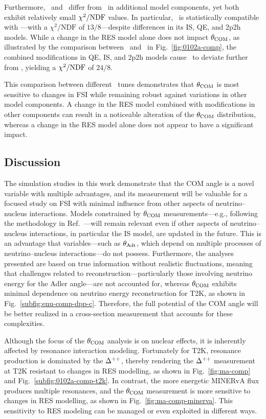      Furthermore, \geoa\ and \getwoa\ differ from \gZero\ in additional model components, yet both exhibit relatively small $\chi^2/{\textrm{NDF}}$ values.
     In particular, \getwoa\ is statistically compatible with \gZero—with a $\chi^2/\textrm{NDF}$ of $13/8$—despite differences in its IS, QE, and 2p2h models.
     While a change in the RES model alone does not impact $\theta_{\textrm{COM}}$, as illustrated by the comparison between \geoa\ and \getwoa\ in Fig.~\ref{fig:0102a-comp}, the combined modifications in QE, IS, and 2p2h models cause \geoa\ to deviate further from \gZero, yielding a $\chi^2/{\textrm{NDF}}$ of $24/8$.

     This comparison between different \genie\ tunes demonstrates that $\theta_{\textrm{COM}}$ is most sensitive to changes in FSI while remaining robust against variations in other model components.
     A change in the RES model combined with modifications in other components can result in a noticeable alteration of the $\theta_{\textrm{COM}}$ distribution, whereas a change in the RES model alone does not appear to have a significant impact.


     \subsection{Discussion}
     \label{sec:dis}
     The simulation studies in this work demonstrate that the COM angle is a novel variable with multiple advantages, and its measurement will be valuable for a focused study on FSI with minimal influence from other aspects of neutrino–nucleus interactions.
     Models constrained by $\theta_{\textrm{COM}}$ measurements—e.g., following the methodology in Ref.~\cite{GENIE:2021zuu}—will remain relevant even if other aspects of neutrino–nucleus interactions, in particular the IS model, are updated in the future.
     This is an advantage that variables—such as $\theta_{\textrm{Adt}}$, which depend on multiple processes of neutrino–nucleus interactions—do not possess.
     Furthermore, the analyses presented are based on true information without realistic fluctuations, meaning that challenges related to reconstruction—particularly those involving neutrino energy for the Adler angle—are not accounted for, whereas $\theta_{\textrm{COM}}$ exhibits minimal dependence on neutrino energy reconstruction for T2K, as shown in Fig.~\ref{subfig:enu-comp-dpp-c}.
     Therefore, the full potential of the COM angle will be better realized in a cross-section measurement that accounts for these complexities.

     Although the focus of the $\theta_{\textrm{COM}}$ analysis is on nuclear effects, it is inherently affected by resonance interaction modeling.
     Fortunately for T2K, resonance production is dominated by the $\Delta^{++}$, thereby rendering the $\Delta^{++}$ measurement at T2K resistant to changes in RES modelling, as shown in Fig.~\ref{fig:ma-comp} and Fig.~\ref{subfig:0102a-comp-t2k}.
     In contrast, the more energetic MINERvA flux produces multiple resonances, and the $\theta_{\textrm{COM}}$ measurement is more sensitive to changes in RES modelling, as shown in Fig.~\ref{fig:ma-comp-minerva}.
     This sensitivity to RES modeling can be managed or even exploited in different ways.

